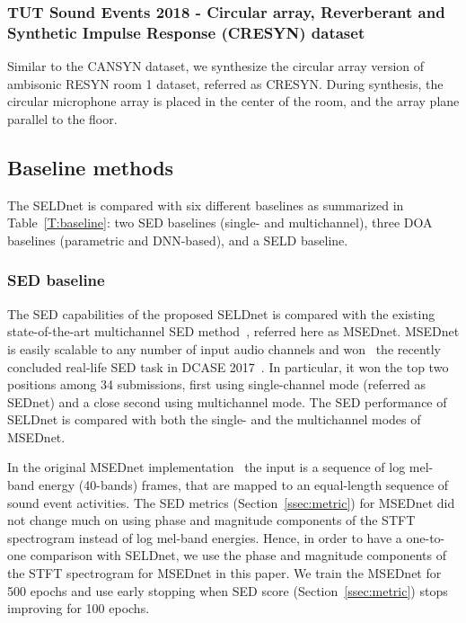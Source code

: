 \documentclass[journal]{IEEEtran}
\begin{document}
\subsubsection{TUT Sound Events 2018 - Circular array, Reverberant and Synthetic Impulse Response (CRESYN) dataset} 
Similar to the CANSYN dataset, we synthesize the circular array version of ambisonic RESYN room 1 dataset, referred as CRESYN. During synthesis, the circular microphone array is placed in the center of the room, and the array plane parallel to the floor.


\subsection{Baseline methods}
The SELDnet is compared with six different baselines as summarized in Table~\ref{T:baseline}: two SED baselines (single- and multichannel), three DOA baselines (parametric and DNN-based), and a SELD baseline. 

\subsubsection{SED baseline}
The SED capabilities of the proposed SELDnet is compared with the existing state-of-the-art multichannel SED method~\cite{Adavanne2017}, referred here as MSEDnet. MSEDnet is easily scalable to any number of input audio channels and won~\cite{Adavanne_DCASE2017_binaural} the recently concluded real-life SED task in DCASE 2017~\cite{dcase2017}. In particular, it won the top two positions among 34 submissions, first using single-channel mode (referred as SEDnet) and a close second using multichannel mode. The SED performance of SELDnet is compared with both the single- and the multichannel modes of MSEDnet. 

In the original MSEDnet implementation~\cite{Adavanne2017} the input is a sequence of log mel-band energy (40-bands) frames, that are mapped to an equal-length sequence of sound event activities. The SED metrics (Section~\ref{ssec:metric}) for MSEDnet did not change much on using phase and magnitude components of the STFT spectrogram instead of log mel-band energies. Hence, in order to have a one-to-one comparison with SELDnet, we use the phase and magnitude components of the STFT spectrogram for MSEDnet in this paper. We train the MSEDnet for 500 epochs and use early stopping when SED score (Section~\ref{ssec:metric}) stops improving for 100 epochs.
\end{document}
